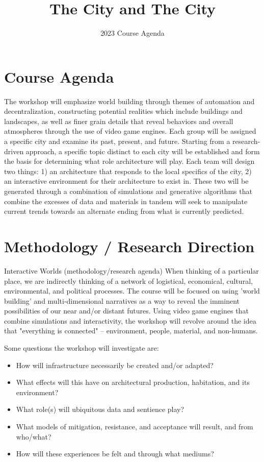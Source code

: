 \documentclass{article}
\title{The City and The City}
\author{2023 Course Agenda}
\date{}
\begin{document}
\maketitle

\section{Course Agenda}


The workshop will emphasize world building through themes of automation and decentralization, constructing potential realities which include buildings and landscapes, as well as finer grain details that reveal behaviors and overall atmospheres through the use of video game engines. Each group will be assigned a specific city and examine its past, present, and future. Starting from a research-driven approach, a specific topic distinct to each city will be established and form the basis for determining what role architecture will play. Each team will design two things: 1) an architecture that responds to the local specifics of the city, 2) an interactive environment for their architecture to exist in. These two will be generated through a combination of simulations and generative algorithms that combine the excesses of data and materials in tandem will seek to manipulate current trends towards an alternate ending from what is currently predicted.

\section{Methodology / Research Direction}
Interactive Worlds (methodology/research agenda)
\newline \newline
When thinking of a particular place, we are indirectly thinking of a network of logistical, economical, cultural, environmental, and political processes. The course will be focused on using 'world building' and multi-dimensional narratives as a way to reveal the imminent possibilities of our near and/or distant futures. Using video game engines that combine simulations and interactivity, the workshop will revolve around the idea that "everything is connected" -- environment, people, material, and non-humans.

Some questions the workshop will investigate are:
\begin{itemize}
    \item How will infrastructure necessarily be created and/or adapted?
    \item What effects will this have on architectural production, habitation, and its environment?
    \item What role(s) will ubiquitous data and sentience play?
    \item What models of mitigation, resistance, and acceptance will result, and from who/what?
    \item How will these experiences be felt and through what mediums?
\end{itemize}
\end{document}
